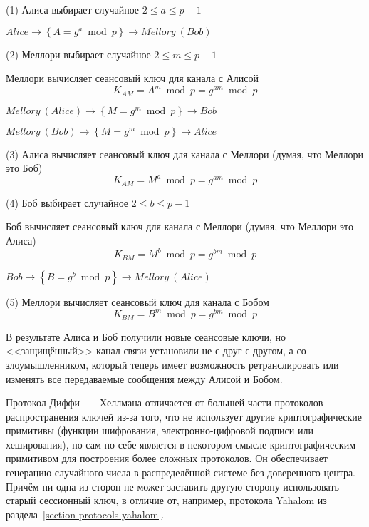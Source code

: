 \begin{protocol}
    \item[(1)] Алиса выбирает случайное $2 \leq a \leq p - 1$
    \item[{}] $Alice \to \left\{ A = g ^ a \bmod p \right\} \to Mellory~(Bob)$
    \item[(2)] Меллори выбирает случайное $2 \leq m \leq p-1$
    \item[{}] Меллори вычисляет сеансовый ключ для канала с Алисой
        \[K_{AM} = A ^ m \bmod p = g ^ {am} \bmod p\]
    \item[{}] $Mellory~(Alice) \to \left\{ M = g ^ m \bmod p \right\} \to Bob$
    \item[{}] $Mellory~(Bob) \to \left\{ M = g ^ m \bmod p \right\} \to Alice$
    \item[(3)] Алиса вычисляет сеансовый ключ для канала с Меллори (думая, что Меллори это Боб)
        \[K_{AM} = M ^ a \bmod p = g ^ { am } \bmod p\]
\pagebreak
    \item[(4)] Боб выбирает случайное $2 \leq b \leq p-1$
    \item[{}] Боб вычисляет сеансовый ключ для канала с Меллори (думая, что Меллори это Алиса)
        \[K_{BM} = M ^ b \bmod p = g ^ { bm } \bmod p\]
    \item[{}] $Bob \to \left\{ B = g ^ b \bmod p \right\} \to Mellory~(Alice)$
    \item[(5)] Меллори вычисляет сеансовый ключ для канала с Бобом
        \[K_{BM} = B ^ m \bmod p = g ^ { bm } \bmod p\]
\end{protocol}

В результате Алиса и Боб получили новые сеансовые ключи, но <<защищённый>> канал связи установили не с друг с другом, а со злоумышленником, который теперь имеет возможность ретранслировать или изменять все передаваемые сообщения между Алисой и Бобом.

Протокол Диффи~---~Хеллмана отличается от большей части протоколов распространения ключей из-за того, что не использует другие криптографические примитивы (функции шифрования, электронно-цифровой подписи или хеширования), но сам по себе является в некотором смысле криптографическим примитивом для построения более сложных протоколов. Он обеспечивает генерацию случайного числа в распределённой системе без доверенного центра. Причём ни одна из сторон не может заставить другую сторону использовать старый сессионный ключ, в отличие от, например, протокола Yahalom из раздела~\ref{section-protocols-yahalom}.

